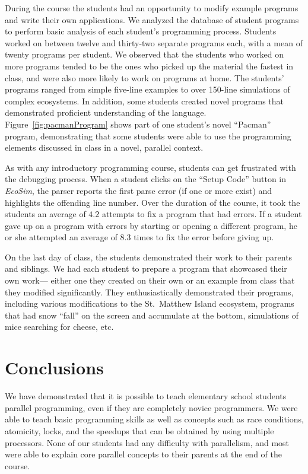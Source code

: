 \documentclass{sig-alternate}
\newcommand{\FIXME}[1]{{\color{red}\{FIXME #1\}}}
\begin{document}
During the course the students had an opportunity to modify example programs and write their own applications.  
We analyzed the database of student programs to perform basic analysis of each student's programming process.
Students worked on between twelve and thirty-two separate programs each, with a mean of twenty programs per student.  
We observed that the students who worked on more programs tended to be the ones who picked up
the material the fastest in class, and were also more likely to work on programs at home.  
The students' programs ranged from simple five-line examples to over 150-line simulations of complex ecosystems.
In addition, some students created novel programs that demonstrated proficient understanding of the language.  
Figure~\ref{fig:pacmanProgram} shows part of one student's novel ``Pacman'' program, 
demonstrating that some students were able to use the programming elements discussed in class
in a novel, parallel context.

As with any introductory programming course, students can get frustrated with the debugging
process.  When a student clicks on the ``Setup Code'' button in \emph{EcoSim}, the parser reports
the first parse error (if one or more exist) and highlights the offending line number.  Over the
duration of the course, it took the students an average of $4.2$ attempts to fix a program that
had errors.  If a student gave up on a program with errors by starting or opening a different
program, he or she attempted an average of $8.3$ times to fix the error before giving up.


On the last day of class, the students demonstrated their work to their parents and siblings. 
We had each student to prepare a program that showcased their own work---%
either one they created on their own or an example from class that they modified significantly.
They enthusiastically demonstrated their programs,
including various modifications to the St.~Matthew Island ecosystem,
programs that had snow ``fall'' on the screen and accumulate at the bottom,
simulations of mice searching for cheese,
etc.

\section{Conclusions}
We have demonstrated that it is possible to teach elementary school students parallel programming,
even if they are completely novice programmers. 
We were able to teach basic programming skills as well as concepts such as race conditions, 
atomicity, locks, and the speedups that can be obtained by using multiple processors.
None of our students had any difficulty with parallelism, 
and most were able to explain core parallel concepts to their parents at the end of the course.
\end{document}
